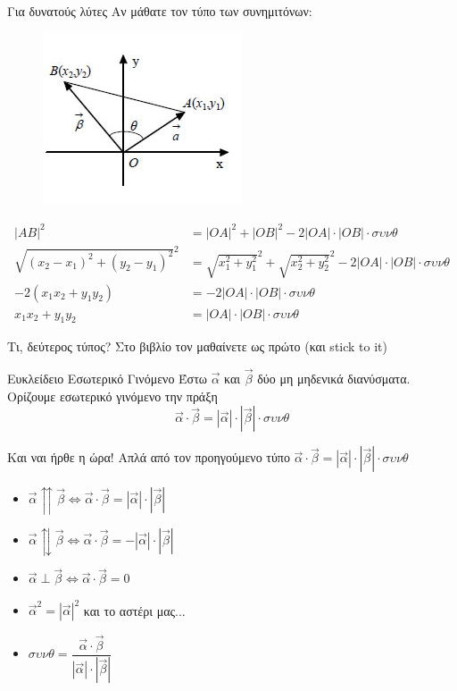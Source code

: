 \documentclass{../../presentation}
\begin{document}
\begin{frame}{Για δυνατούς λύτες}
  Αν μάθατε τον τύπο των συνημιτόνων:
  \begin{figure}
    \centering
    \includegraphics[width=0.35 \textwidth]{"../images/dotproductproof"}
  \end{figure}
  \begin{align*}
    |AB|^2                           & =|OA|^2+|OB|^2-2|OA|\cdot|ΟΒ|\cdot συνθ                             \\
    \sqrt{(x_2-x_1)^2+(y_2-y_1)^2}^2 & =\sqrt{x_1^2+y_1^2}^2+\sqrt{x_2^2+y_2^2}^2-2|OA|\cdot|ΟΒ|\cdot συνθ \\
    -2(x_1x_2+y_1y_2)                & =-2|OA|\cdot|ΟΒ|\cdot συνθ                                          \\
    x_1x_2+y_1y_2                    & =|OA|\cdot|ΟΒ|\cdot συνθ
  \end{align*}
\end{frame}

\begin{frame}{Τι, δεύτερος τύπος?}
  Στο βιβλίο τον μαθαίνετε ως πρώτο (και stick to it)
  \begin{block}{Ευκλείδειο Εσωτερικό Γινόμενο}
    Έστω $\vec{α}$ και $\vec{β}$ δύο μη μηδενικά διανύσματα. Ορίζουμε εσωτερικό γινόμενο την πράξη
    $$\vec{α}\cdot\vec{β} = |\vec{α}|\cdot|\vec{β}|\cdot συνθ$$
  \end{block}

\end{frame}

\begin{frame}{Και ναι ήρθε η ώρα!}
  Απλά από τον προηγούμενο τύπο $\vec{α}\cdot\vec{β} = |\vec{α}|\cdot|\vec{β}|\cdot συνθ$
  \begin{itemize}
    \item<1-> $\vec{α}\upuparrows\vec{β}\iff \vec{α}\cdot\vec{β} = |\vec{α}|\cdot|\vec{β}|$
    \item<2-> $\vec{α}\updownarrows\vec{β}\iff \vec{α}\cdot\vec{β} = -|\vec{α}|\cdot|\vec{β}|$
    \item<3-> $\vec{α}\perp\vec{β}\iff \vec{α}\cdot\vec{β} = 0$
    \item<4-> $\vec{α}^2=|\vec{α}|^2$
           {και το αστέρι μας...}
    \item<6-> $συνθ=\dfrac{\vec{α}\cdot\vec{β}}{|\vec{α}|\cdot|\vec{β}|}$
  \end{itemize}
\end{frame}
\end{document}
